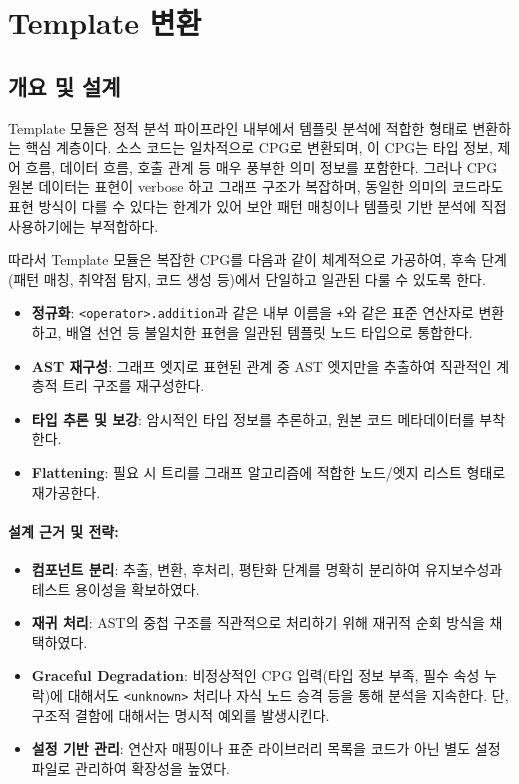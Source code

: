 \clearpage

\section{Template 변환}

\subsection{개요 및 설계}
Template 모듈은 정적 분석 파이프라인 내부에서  템플릿 분석에 적합한 형태로 변환하는 핵심 계층이다. 소스 코드는 일차적으로 CPG로 변환되며, 이 CPG는 타입 정보, 제어 흐름, 데이터 흐름, 호출 관계 등 매우 풍부한 의미 정보를 포함한다. 그러나 CPG 원본 데이터는 표현이 verbose 하고 그래프 구조가 복잡하며, 동일한 의미의 코드라도 표현 방식이 다를 수 있다는 한계가 있어 보안 패턴 매칭이나 템플릿 기반 분석에 직접 사용하기에는 부적합하다.

따라서 Template 모듈은 복잡한 CPG를 다음과 같이 체계적으로 가공하여, 후속 단계(패턴 매칭, 취약점 탐지, 코드 생성 등)에서 단일하고 일관된  다룰 수 있도록 한다.

\begin{itemize}
    \item \textbf{정규화}: \texttt{<operator>.addition}과 같은 내부 이름을 \texttt{+}와 같은 표준 연산자로 변환하고, 배열 선언 등 불일치한 표현을 일관된 템플릿 노드 타입으로 통합한다.
    \item \textbf{AST 재구성}: 그래프 엣지로 표현된 관계 중 AST 엣지만을 추출하여 직관적인 계층적 트리 구조를 재구성한다.
    \item \textbf{타입 추론 및 보강}: 암시적인 타입 정보를 추론하고, 원본 코드 메타데이터를 부착한다.
    \item \textbf{Flattening}: 필요 시 트리를 그래프 알고리즘에 적합한 노드/엣지 리스트 형태로 재가공한다.
\end{itemize}

\paragraph{\textbf{설계 근거 및 전략}:}
\begin{itemize}
    \item \textbf{컴포넌트 분리}: 추출, 변환, 후처리, 평탄화 단계를 명확히 분리하여 유지보수성과 테스트 용이성을 확보하였다.
    \item \textbf{재귀 처리}: AST의 중첩 구조를 직관적으로 처리하기 위해 재귀적 순회 방식을 채택하였다.
    \item \textbf{Graceful Degradation}: 비정상적인 CPG 입력(타입 정보 부족, 필수 속성 누락)에 대해서도 \texttt{<unknown>} 처리나 자식 노드 승격 등을 통해 분석을 지속한다. 단, 구조적 결함에 대해서는 명시적 예외를 발생시킨다.
    \item \textbf{설정 기반 관리}: 연산자 매핑이나 표준 라이브러리 목록을 코드가 아닌 별도 설정 파일로 관리하여 확장성을 높였다.
\end{itemize}

